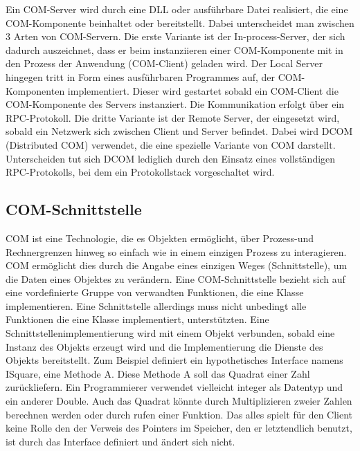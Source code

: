 Ein COM-Server wird durch eine DLL oder ausführbare Datei realisiert, die eine COM-Komponente beinhaltet oder bereitstellt. Dabei unterscheidet man zwischen 3 Arten von COM-Servern. Die erste Variante ist der In-process-Server, der sich dadurch auszeichnet, dass er beim instanziieren einer COM-Komponente mit in den Prozess der Anwendung (COM-Client) geladen wird. Der Local Server hingegen tritt in Form eines ausführbaren Programmes auf, der COM-Komponenten implementiert. Dieser wird gestartet sobald ein COM-Client die COM-Komponente des Servers instanziert. Die Kommunikation erfolgt über ein RPC-Protokoll. Die dritte Variante ist der Remote Server, der eingesetzt wird, sobald ein Netzwerk sich zwischen Client und Server befindet. Dabei wird DCOM (Distributed COM) verwendet, die eine spezielle Variante von COM darstellt. Unterscheiden tut sich DCOM lediglich durch den Einsatz eines vollständigen RPC-Protokolls, bei dem ein Protokollstack vorgeschaltet wird. 
 
\subsection{COM-Schnittstelle}
\label{ch:grundlagen:sec:ComponentObjectModel:subsec:COMSchnittstelle}

COM ist eine Technologie, die es Objekten ermöglicht, über Prozess-und Rechnergrenzen hinweg so einfach wie in einem einzigen Prozess zu interagieren. COM ermöglicht dies durch die Angabe eines einzigen Weges (Schnittstelle), um die Daten eines Objektes zu verändern. Eine COM-Schnittstelle bezieht sich auf eine vordefinierte Gruppe von verwandten Funktionen, die eine Klasse implementieren. Eine Schnittstelle allerdings muss nicht unbedingt alle Funktionen die eine Klasse implementiert, unterstützten. Eine Schnittstellenimplementierung wird mit einem Objekt verbunden, sobald eine Instanz des Objekts erzeugt wird und die Implementierung die Dienste des Objekts bereitstellt. Zum Beispiel definiert ein hypothetisches Interface namens ISquare, eine Methode A. Diese Methode A soll das Quadrat einer Zahl zurückliefern. Ein Programmierer verwendet vielleicht integer als Datentyp und ein anderer Double. Auch das Quadrat könnte durch Multiplizieren zweier Zahlen berechnen werden oder durch rufen einer Funktion. Das alles spielt für den Client keine Rolle den der Verweis des Pointers im Speicher, den er letztendlich benutzt, ist durch das Interface definiert und ändert sich nicht. 

